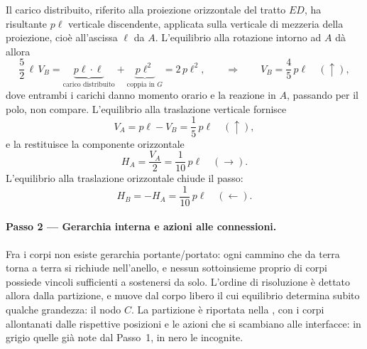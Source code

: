 \begin{esercizio}
\begin{svolgimento}
		
		
		
		Il carico distribuito, riferito alla proiezione orizzontale del
		tratto $ED$, ha risultante $p\ell$ verticale discendente, applicata
		sulla verticale di mezzeria della proiezione, cioè all'ascissa
		$\ell$ da $A$. L'equilibrio alla rotazione intorno ad $A$ dà allora
		\[
		\frac{5}{2}\,\ell\,V_B = \underbrace{p\ell \cdot \ell}_{\text{carico
				distribuito}} + \underbrace{p\ell^{2}}_{\text{coppia in }G}
		= 2\,p\ell^{2} ,
		\qquad\Longrightarrow\qquad
		V_B = \frac{4}{5}\,p\ell \quad (\uparrow) ,
		\]
		dove entrambi i carichi danno momento orario e la reazione in $A$,
		passando per il polo, non compare. L'equilibrio alla traslazione
		verticale fornisce
		\[
		V_A = p\ell - V_B = \frac{1}{5}\,p\ell \quad (\uparrow) ,
		\]
		e la  restituisce la componente
		orizzontale
		\[
		H_A = \frac{V_A}{2} = \frac{1}{10}\,p\ell \quad (\rightarrow) .
		\]
		L'equilibrio alla traslazione orizzontale chiude il passo:
		\[
		H_B = -H_A = \frac{1}{10}\,p\ell \quad (\leftarrow) .
		\]
	
		



		
		
		\paragraph{Passo 2 --- Gerarchia interna e azioni alle connessioni.}
		
		Fra i corpi non esiste gerarchia portante/portato: ogni cammino che
		da terra torna a terra si richiude nell'anello, e nessun sottoinsieme
		proprio di corpi possiede vincoli sufficienti a sostenersi da solo.
		L'ordine di risoluzione è dettato allora dalla partizione, e muove
		dal corpo libero il cui equilibrio determina subito qualche
		grandezza: il nodo $C$. La partizione è riportata nella , con
		i corpi allontanati dalle rispettive posizioni e le azioni che si
		scambiano alle interfacce: in grigio quelle già note dal Passo~1, in
		nero le incognite.
		

\end{svolgimento}
\end{esercizio}
